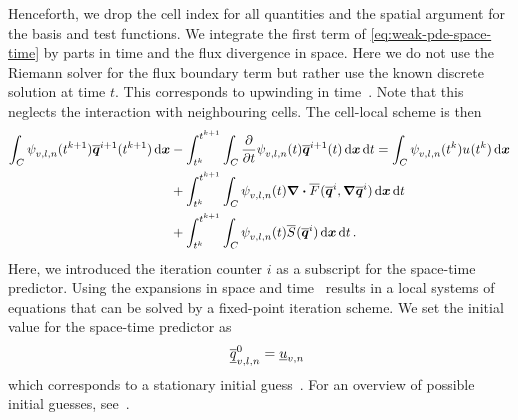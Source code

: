 Henceforth, we drop the cell index for all quantities and the spatial argument for the basis and test functions.
We integrate the first term of \cref{eq:weak-pde-space-time} by parts in time and the flux divergence in space.
Here we do not use the Riemann solver for the flux boundary term but rather use the known discrete solution at time $t$.
This corresponds to upwinding in time~\cite{dumbser2008unified}.
Note that this neglects the interaction with neighbouring cells.
The cell-local scheme is then
\begin{align}\label{eq:space-time-predictor}
\begin{split}
\intdcell{
  \sttestfunction[][v,l,n] (\nextTime) \stpredictor[i+1](\nextTime)
}
&-
\intdt{\intdcell{
    \pdv{}{t} \sttestfunction[][v,l,n] (t) \stpredictor[i+1](t)
}}
= 
\intdcell{
  \sttestfunction[][v,l,n] (\curTime) \ssol (\curTime)
}
\\&+
\intdt{\intdcell{
    \sttestfunction[][v,l,n] (t) \divergence{\stflux(\stpredictor[i], \gradient{\stpredictor[i]})}
}}
\\&+
\intdt{\intdcell{
    \sttestfunction[][v,l,n] (t) \stsource(\stpredictor[i])
}}.
\end{split}
\end{align}
Here, we introduced the iteration counter $i$ as a subscript for the space-time predictor.
Using the expansions in space and time~ results in a local systems of equations that can be solved by a fixed-point iteration scheme.
We set the initial value for the space-time predictor as
\begin{equation}
  \label{eq:initial-guess}
\quad \stpredictorCoeff[0][v,l,n] = \ssolCoeff[][v,n]
\end{equation}
which corresponds to a stationary initial guess~\cite{dumbser2008unified}.
For an overview of possible initial guesses, see~\cite{dumbser2018efficient}.

